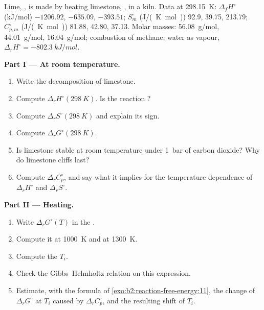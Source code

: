 \begin{problem}
\label{pb:b2:reaction-free-energy:1}
Lime, , is made by heating limestone, , in a kiln. Data at
\qty{298.15}{K}: $\Delta_f H^\circ$ (\unit{kJ/mol}) 
$-1206.92$,  $-635.09$,  $-393.51$; $S^\circ_m$
(\unit{J/(K.mol)}) 92.9, 39.75, 213.79; $C^\circ_{p,m}$ (\unit{J/(K.mol)})
81.88, 42.80, 37.13. Molar masses:  \qty{56.08}{g/mol}, 
\qty{44.01}{g/mol},  \qty{16.04}{g/mol}; combustion of methane,
water as vapour, $\Delta_r H^\circ = \qty{-802.3}{kJ/mol}$.

\medskip
\noindent\textbf{Part I --- At room temperature.}
\begin{enumerate}
  \item Write the decomposition of limestone.
  \item Compute $\Delta_r H^\circ(\qty{298}{K})$. Is the reaction ?
  \item Compute $\Delta_r S^\circ(\qty{298}{K})$ and explain its sign.
  \item Compute $\Delta_r G^\circ(\qty{298}{K})$.
  \item Is limestone stable at room temperature under \qty{1}{bar} of
        carbon dioxide? Why do limestone cliffs last?
  \item Compute $\Delta_r C^\circ_p$, and say what it implies for the
        temperature dependence of $\Delta_r H^\circ$ and $\Delta_r S^\circ$.
\end{enumerate}

\medskip
\noindent\textbf{Part II --- Heating.}
\begin{enumerate}[resume]
  \item Write $\Delta_r G^\circ(T)$ in the .
  \item Compute it at \qty{1000}{K} and at \qty{1300}{K}.
  \item Compute the  $T_i$.
  \item Check the Gibbs--Helmholtz relation on this expression.
  \item Estimate, with the formula of \cref{exo:b2:reaction-free-energy:11},
        the change of $\Delta_r G^\circ$ at $T_i$ caused by
        $\Delta_r C^\circ_p$, and the resulting shift of $T_i$.
\end{enumerate}


\end{problem}
